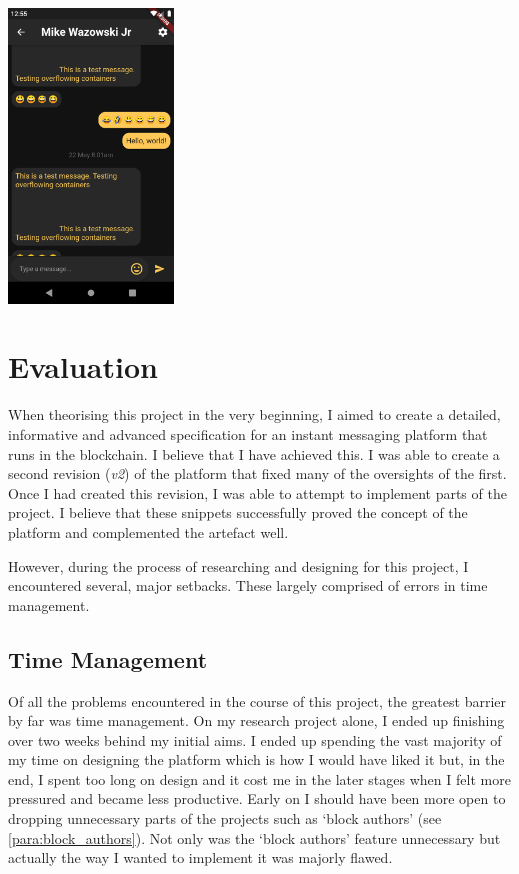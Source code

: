 \documentclass{article}
\begin{document}
\begin{center}
\includegraphics[width=0.33\textwidth]{Images/chains_4.png}\par
\end{center}

\clearpage

\section{Evaluation}
When theorising this project in the very beginning, I aimed to create a detailed, informative and advanced specification for an instant messaging platform that runs in the blockchain. I believe that I have achieved this. I was able to create a second revision (\textit{v2}) of the platform that fixed many of the oversights of the first. Once I had created this revision, I was able to attempt to implement parts of the project. I believe that these snippets successfully proved the concept of the platform and complemented the artefact well.

However, during the process of researching and designing for this project, I encountered several, major setbacks. These largely comprised of errors in time management.

\subsection{Time Management}
Of all the problems encountered in the course of this project, the greatest barrier by far was time management. On my research project alone, I ended up finishing over two weeks behind my initial aims. I ended up spending the vast majority of my time on designing the platform which is how I would have liked it but, in the end, I spent too long on design and it cost me in the later stages when I felt more pressured and became less productive. Early on I should have been more open to dropping unnecessary parts of the projects such as `block authors' (see \autoref{para:block_authors}). Not only was the `block authors' feature unnecessary but actually the way I wanted to implement it was majorly flawed.
\end{document}

